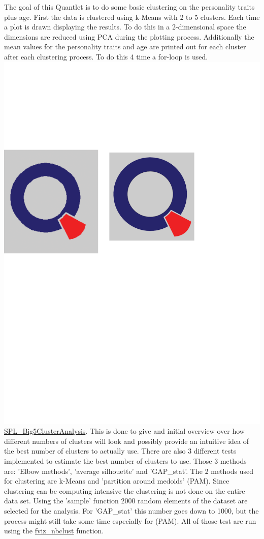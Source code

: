 The goal of this Quantlet is to do some basic clustering on the personality traits plus age. First the data is clustered using k-Means with 2 to 5 clusters. Each time a plot is drawn displaying the results. To do this in a 2-dimensional space the dimensions are reduced using PCA during the plotting process. Additionally the mean values for the personality traits and age are printed out for each cluster after each clustering process. To do this 4 time a for-loop is used. \href{https://github.com/Matthias2193/SPL/blob/5c17336568167689696460c9166539babe69ee23/SPL_Big5ClusterAnalysis/SPL_Big5ClusterAnalysis.R#L10-L22}{\includegraphics[scale = 0.06]{Figures/qletlogo.pdf}SPL\_Big5ClusterAnalysis}. This is done to give and initial overview over how different numbers of clusters will look and possibly provide an intuitive idea of the best number of clusters to actually use.
\newline
There are also 3 different tests implemented to estimate the best number of clusters to use. Those 3 methods are: 'Elbow methods', 'average silhouette' and 'GAP\_stat'. The 2 methods used for clustering are k-Means and 'partition around medoids' (PAM). Since clustering can be computing intensive the clustering is not done on the entire data set. Using the 'sample' function 2000 random elements of the dataset are selected for the analysis. For 'GAP\_stat' this number goes down to 1000, but the process might still take some time especially for (PAM). All of those test are run using the \href{https://www.rdocumentation.org/packages/factoextra/versions/1.0.5/topics/fviz_nbclust}{fviz\_nbclust} function.
